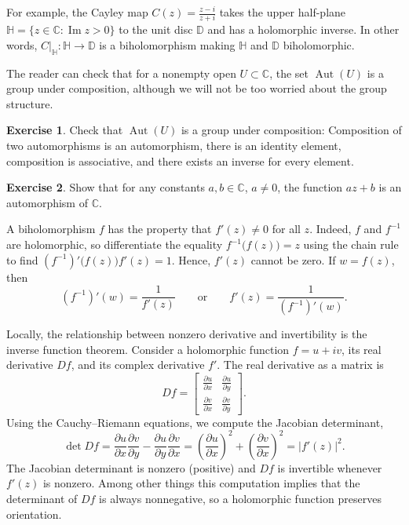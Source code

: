 \documentclass[12pt,openany]{book}
\renewcommand{\Im}{\operatorname{Im}}
\newcommand{\Aut}{\operatorname{Aut}}
\newcommand{\babs}[1]{\bigl\lvert {#1} \bigr\rvert}
\newcommand{\C}{{\mathbb{C}}}
\newcommand{\D}{{\mathbb{D}}}
\newcommand{\bH}{{\mathbb{H}}}
\theoremstyle{plain}
\theoremstyle{remark}
\theoremstyle{definition}
\newenvironment{exbox}{%
    \def\FrameCommand{\vrule width 1pt \relax\hspace{10pt}}%
    \MakeFramed{\advance\hsize-\width\FrameRestore}%
}{%
    \endMakeFramed
}
\theoremstyle{exercise}
\newtheorem{exercise}{Exercise}[section]
\theoremstyle{example}
\begin{document}
For example, the Cayley map
$C(z)
=
\frac{z - i}{z + i}$
takes the upper half-plane
$\bH = \{ z \in \C : \Im z > 0 \}$ to the unit disc $\D$ and
has a holomorphic inverse.
In other words, $C|_{\bH} \colon \bH \to \D$ is a biholomorphism
making $\bH$ and $\D$ biholomorphic.

The reader can check that for a nonempty open $U \subset \C$, the set
$\Aut(U)$ is a group under
composition, although we will not be too worried about the group
structure.

\begin{exbox}
\begin{exercise}
Check that
$\Aut(U)$ is a group under composition:
Composition of two automorphisms is an automorphism,
there is an identity element,
composition is associative,
and there exists an inverse for every element.
\end{exercise}

\begin{exercise}
Show that for any constants $a,b \in \C$, $a \not= 0$, the function
$a z + b$ is an automorphism of $\C$.
\end{exercise}
\end{exbox}

A biholomorphism $f$ has the property that $f'(z) \not= 0$ for all $z$.
Indeed,
$f$ and $f^{-1}$ are holomorphic, so differentiate the
equality
$f^{-1}\bigl(f(z)\bigr) = z$ using the chain rule to find
$(f^{-1})' \bigl(f(z)\bigr) f'(z) = 1$.  Hence, $f'(z)$ cannot be zero.
If $w = f(z)$, then
\begin{equation*}
(f^{-1})'(w) = \frac{1}{f'(z)}
\qquad \text{or} \qquad
f'(z) =
\frac{1}{(f^{-1})'(w)} .
\end{equation*}

Locally, the relationship between nonzero derivative and invertibility is
the inverse function theorem.  Consider a holomorphic function
$f = u+iv$, its real derivative $Df$, and its complex derivative $f'$.
The real derivative as a matrix is
\begin{equation*}
Df =
\begin{bmatrix}
\frac{\partial u}{\partial x} & \frac{\partial u}{\partial y} \\[5pt]
\frac{\partial v}{\partial x} & \frac{\partial v}{\partial y}
\end{bmatrix} .
\end{equation*}
Using the Cauchy--Riemann equations, we compute the Jacobian determinant,
\begin{equation*}
\det Df =
\frac{\partial u}{\partial x}
\frac{\partial v}{\partial y} -
\frac{\partial u}{\partial y} 
\frac{\partial v}{\partial x}
=
{\left(\frac{\partial u}{\partial x}\right)}^2
+
{\left(\frac{\partial v}{\partial x}\right)}^2
=
\babs{f'(z)}^2 .
\end{equation*}
The Jacobian determinant is nonzero (positive) and $Df$ is invertible
whenever $f'(z)$ is nonzero.
Among other things this computation
implies that the determinant of
$Df$ is always nonnegative, so a holomorphic function preserves orientation.
\end{document}
